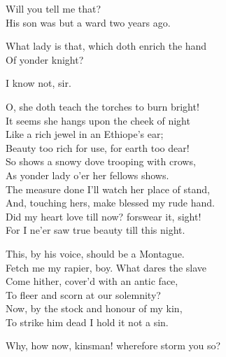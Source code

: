 \begin{speech}
Will you tell me that? \\
His son was but a ward two years ago. \\
\end{speech}
\begin{speech}
 What lady is that, which doth enrich the hand
\\
Of yonder knight? \\
\end{speech}
\begin{speech}
I know not, sir. \\
\end{speech}
\begin{speech}
O, she doth teach the torches to burn bright! \\
It seems she hangs upon the cheek of night \\
Like a rich jewel in an Ethiope's ear; \\
Beauty too rich for use, for earth too dear! \\
So shows a snowy dove trooping with crows, \\
As yonder lady o'er her fellows shows. \\
The measure done I'll watch her place of stand, \\
And, touching hers, make blessed my rude hand. \\
Did my heart love till now? forswear it, sight! \\
For I ne'er saw true beauty till this night. \\
\end{speech}
\begin{speech}
This, by his voice, should be a Montague. \\
Fetch me my rapier, boy.   What dares the slave \\
Come hither, cover'd with an antic face, \\
To fleer and scorn at our solemnity? \\
Now, by the stock and honour of my kin, \\
To strike him dead I hold it not a sin. \\
\end{speech}
\begin{speech}
Why, how now, kinsman! wherefore storm you so? \\

\end{speech}
